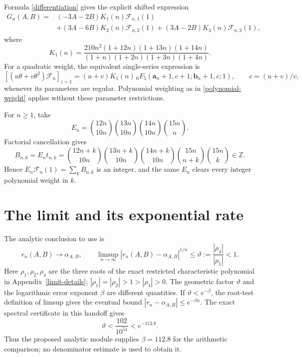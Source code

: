 \documentclass[11pt]{article}
\newcommand{\Z}{\mathbb Z}
\newcommand{\F}{\mathcal F}
\begin{document}
Formula \eqref{differentiation} gives the explicit shifted expression
\begin{align*}
 G_n(A,B)={}&(-3A-2B)K_1(n)\F_{n,1}(1)\\
 &+(3A-6B)K_2(n)\F_{n,2}(1)
 +(3A-2B)K_3(n)\F_{n,3}(1),
\end{align*}
where
\[
 K_1(n)=\frac{210n^2(1+12n)(1+13n)(1+14n)}
 {(1+n)(1+2n)(1+3n)(1+4n)}.
\]
For a quadratic weight, the equivalent single-series expression is
\[
 [(u\theta+v\theta^2)\F_n]_{z=1}
 =(u+v)K_1(n)\,{}_6F_5(\mathbf a_n+1,c+1;\mathbf b_n+1,c;1),
 \qquad c=(u+v)/v,
\]
whenever its parameters are regular. Polynomial weighting as in
\eqref{polynomial-weight} applies without these parameter restrictions.

For $n\geq1$, take
\begin{equation}\label{E}
 E_n=\binom{12n}{10n}\binom{13n}{10n}
        \binom{14n}{10n}\binom{15n}{n}.
\end{equation}
Factorial cancellation gives
\begin{equation}\label{B}
 B_{n,k}=E_nt_{n,k}
 =\binom{12n+k}{10n}\binom{13n+k}{10n}\binom{14n+k}{10n}
  \binom{15n}{n+k}\binom{15n}{k}\in\Z.
\end{equation}
Hence $E_n\F_n(1)=\sum_kB_{n,k}$ is an integer, and the same $E_n$
clears every integer polynomial weight in $k$.


\section{The limit and its exponential rate}\label{limit-interface}
The analytic conclusion to use is
\begin{equation}\label{geometric-error}
 r_n(A,B)\longrightarrow\alpha_{A,B},\qquad
 \limsup_{n\to\infty}|r_n(A,B)-\alpha_{A,B}|^{1/n}
 \leq\vartheta:=\frac{|\rho_4|}{|\rho_1|}<1.
\end{equation}
Here $\rho_1,\rho_2,\rho_4$ are the three roots of the exact restricted
characteristic polynomial in Appendix~\ref{limit-details};
$|\rho_1|=|\rho_2|>1>|\rho_4|>0$.
The geometric factor $\vartheta$ and the logarithmic error exponent
$\beta$ are different quantities. If $\vartheta<e^{-\beta}$, the
root-test definition of limsup gives the eventual bound
$|r_n-\alpha_{A,B}|\leq e^{-\beta n}$.
The exact spectral certificate in this handoff gives
\[
 \vartheta<\frac{102}{10^{51}}<e^{-112.8}.
\]
Thus the proposed analytic module supplies $\beta=112.8$ for the
arithmetic comparison; no denominator estimate is used to obtain it.
\end{document}
